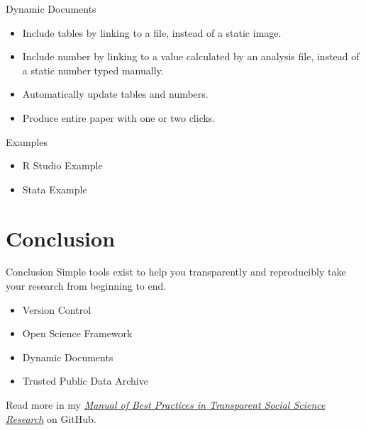 \documentclass{beamer}
\begin{document}
\begin{frame}{Dynamic Documents}
\begin{itemize}
\item Include tables by linking to a file, instead of a static image.
\item Include number by linking to a value calculated by an analysis file, instead of a static number typed manually.
\item Automatically update tables and numbers.
\item Produce entire paper with one or two clicks.
\end{itemize} 
\end{frame}


\begin{frame}{Examples}
\begin{itemize}
\item
R Studio Example
\item
Stata Example
\end{itemize}
\end{frame}



\section{Conclusion}
\begin{frame}{Conclusion}
Simple tools exist to help you transparently and reproducibly take your research from beginning to end. 
\begin {itemize}

\item Version Control
\item Open Science Framework
\item Dynamic Documents
\item Trusted Public Data Archive
\end{itemize} 
\vspace{0.25in}
Read more in my \href{http://github.com/garretchristensen/manual}{\textit{Manual of Best Practices in Transparent Social Science Research}} on GitHub.
\end{frame}
\end{document}
